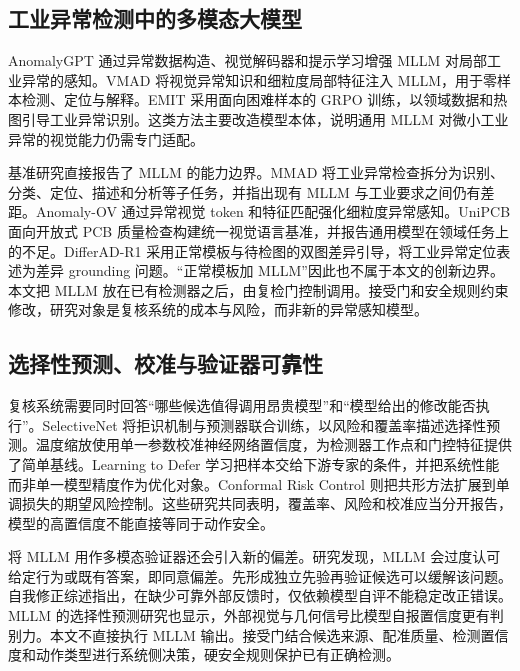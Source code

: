 \subsection{工业异常检测中的多模态大模型}

AnomalyGPT 通过异常数据构造、视觉解码器和提示学习增强 MLLM 对局部工业异常的感知\cite{gu2024anomalygpt}。VMAD 将视觉异常知识和细粒度局部特征注入 MLLM，用于零样本检测、定位与解释\cite{deng2024vmad}。EMIT 采用面向困难样本的 GRPO 训练，以领域数据和热图引导工业异常识别\cite{guan2025emit}。这类方法主要改造模型本体，说明通用 MLLM 对微小工业异常的视觉能力仍需专门适配。

基准研究直接报告了 MLLM 的能力边界。MMAD 将工业异常检查拆分为识别、分类、定位、描述和分析等子任务，并指出现有 MLLM 与工业要求之间仍有差距\cite{jiang2025mmad}。Anomaly-OV 通过异常视觉 token 和特征匹配强化细粒度异常感知\cite{xu2025anomalyov}。UniPCB 面向开放式 PCB 质量检查构建统一视觉语言基准，并报告通用模型在领域任务上的不足\cite{sun2026unipcb}。DifferAD-R1 采用正常模板与待检图的双图差异引导，将工业异常定位表述为差异 grounding 问题\cite{wang2026differadr1}。“正常模板加 MLLM”因此也不属于本文的创新边界。本文把 MLLM 放在已有检测器之后，由复检门控制调用。接受门和安全规则约束修改，研究对象是复核系统的成本与风险，而非新的异常感知模型。

\subsection{选择性预测、校准与验证器可靠性}

复核系统需要同时回答“哪些候选值得调用昂贵模型”和“模型给出的修改能否执行”。SelectiveNet 将拒识机制与预测器联合训练，以风险和覆盖率描述选择性预测\cite{geifman2019selectivenet}。温度缩放使用单一参数校准神经网络置信度，为检测器工作点和门控特征提供了简单基线\cite{guo2017calibration}。Learning to Defer 学习把样本交给下游专家的条件，并把系统性能而非单一模型精度作为优化对象\cite{mozannar2020defer}。Conformal Risk Control 则把共形方法扩展到单调损失的期望风险控制\cite{angelopoulos2024conformalrisk}。这些研究共同表明，覆盖率、风险和校准应当分开报告，模型的高置信度不能直接等同于动作安全。

将 MLLM 用作多模态验证器还会引入新的偏差。研究发现，MLLM 会过度认可给定行为或既有答案，即同意偏差。先形成独立先验再验证候选可以缓解该问题\cite{andrade2026agreementbias}。自我修正综述指出，在缺少可靠外部反馈时，仅依赖模型自评不能稳定改正错误\cite{kamoi2024selfcorrection}。MLLM 的选择性预测研究也显示，外部视觉与几何信号比模型自报置信度更有判别力\cite{imran2026trustvlm}。本文不直接执行 MLLM 输出。接受门结合候选来源、配准质量、检测置信度和动作类型进行系统侧决策，硬安全规则保护已有正确检测。


